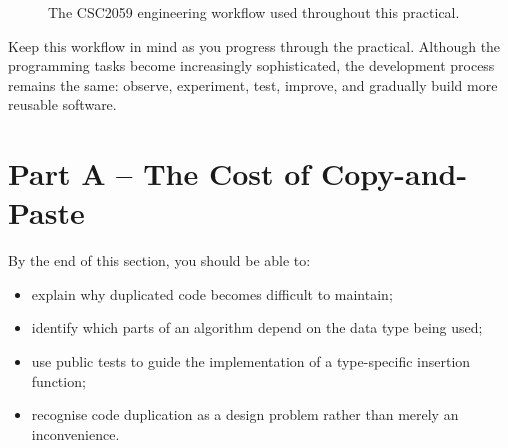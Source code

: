 \documentclass{csc2059practical}
\begin{document}
\begin{figure}[H]

\caption{The CSC2059 engineering workflow used throughout this practical.}
\label{fig:csc2059-engineering-workflow}
\end{figure}

Keep this workflow in mind as you progress through the practical. Although the
programming tasks become increasingly sophisticated, the development process
remains the same: observe, experiment, test, improve, and gradually build more
reusable software.


\section{Part A -- The Cost of Copy-and-Paste}

\begin{learningoutcomes}
By the end of this section, you should be able to:
\begin{itemize}
    \item explain why duplicated code becomes difficult to maintain;
    \item identify which parts of an algorithm depend on the data type being used;
    \item use public tests to guide the implementation of a type-specific insertion function;
    \item recognise code duplication as a design problem rather than merely an inconvenience.
\end{itemize}
\end{learningoutcomes}
\end{document}
